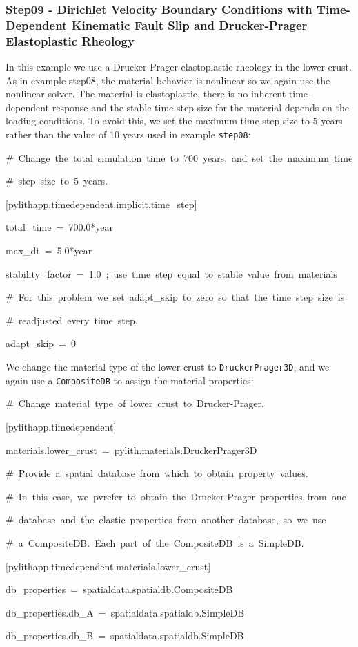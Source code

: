 \subsubsection{Step09 - Dirichlet Velocity Boundary Conditions with Time-Dependent
Kinematic Fault Slip and Drucker-Prager Elastoplastic Rheology}

In this example we use a Drucker-Prager elastoplastic rheology in
the lower crust. As in example step08, the material behavior is nonlinear
so we again use the nonlinear solver. The material is elastoplastic,
there is no inherent time-dependent response and the stable time-step
size for the material depends on the loading conditions. To avoid
this, we set the maximum time-step size to 5 years rather than the
value of 10 years used in example \texttt{step08}:
\begin{lyxcode}
\#~Change~the~total~simulation~time~to~700~years,~and~set~the~maximum~time

\#~step~size~to~5~years.

{[}pylithapp.timedependent.implicit.time\_step{]}

total\_time~=~700.0{*}year

max\_dt~=~5.0{*}year

stability\_factor~=~1.0~;~use~time~step~equal~to~stable~value~from~materials

\#~For~this~problem~we~set~adapt\_skip~to~zero~so~that~the~time~step~size~is

\#~readjusted~every~time~step.

adapt\_skip~=~0
\end{lyxcode}
We change the material type of the lower crust to \texttt{DruckerPrager3D},
and we again use a \texttt{CompositeDB} to assign the material properties:
\begin{lyxcode}
\#~Change~material~type~of~lower~crust~to~Drucker-Prager.

{[}pylithapp.timedependent{]}

materials.lower\_crust~=~pylith.materials.DruckerPrager3D



\#~Provide~a~spatial~database~from~which~to~obtain~property~values.

\#~In~this~case,~we~pvrefer~to~obtain~the~Drucker-Prager~properties~from~one

\#~database~and~the~elastic~properties~from~another~database,~so~we~use

\#~a~CompositeDB.~Each~part~of~the~CompositeDB~is~a~SimpleDB.

{[}pylithapp.timedependent.materials.lower\_crust{]}

db\_properties~=~spatialdata.spatialdb.CompositeDB

db\_properties.db\_A~=~spatialdata.spatialdb.SimpleDB

db\_properties.db\_B~=~spatialdata.spatialdb.SimpleDB
\end{lyxcode}
